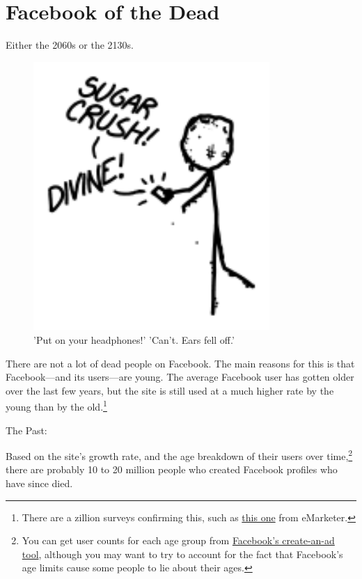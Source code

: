 {{
\chapter{Facebook of the Dead}
}

\hfill{}

{Either the 2060s or the 2130s.}

\begin{figure}[!htbp]
\centering
\includegraphics[scale=0.5, max width=0.8\textwidth]{imgs/a/69/facebook_zombie.png}
\caption{'Put on your headphones!' 'Can't. Ears fell off.'}
\end{figure}

{There are not a lot of dead people on Facebook. The main reasons for this is that Facebook—and its users—are young. The average Facebook user has gotten older over the last few years, but the site is still used at a much higher rate by the young than by the old.{\footnote{There are a zillion surveys confirming this, such as \href{http://www.emarketer.com/Article/Twitter-Use-Drives-Up-LinkedIn-Stalls-UK/1009796}{this one} from eMarketer.} } }

{The Past:}

{Based on the site's growth rate, and the age breakdown of their users over time,{\footnote{You can get user counts for each age group from \href{https://www.facebook.com/ads/create}{Facebook's create-an-ad tool}, although you may want to try to account for the fact that Facebook's age limits cause some people to lie about their ages.} } there are probably 10 to 20 million people who created Facebook profiles who have since died.}

}
